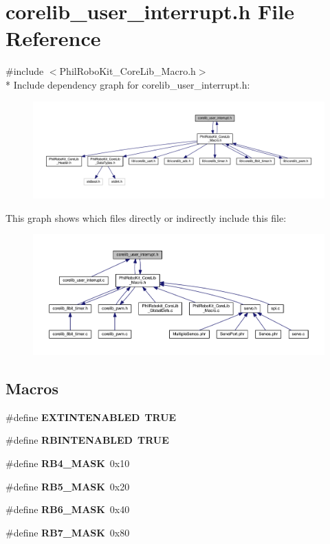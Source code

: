 \section{corelib\-\_\-user\-\_\-interrupt.\-h File Reference}
\label{corelib__user__interrupt_8h}
{\ttfamily \#include $<$Phil\-Robo\-Kit\-\_\-\-Core\-Lib\-\_\-\-Macro.\-h$>$}\\*
Include dependency graph for corelib\-\_\-user\-\_\-interrupt.\-h\-:\nopagebreak
\begin{figure}[H]
\begin{center}
\leavevmode
\includegraphics[width=350pt]{corelib__user__interrupt_8h__incl}
\end{center}
\end{figure}
This graph shows which files directly or indirectly include this file\-:\nopagebreak
\begin{figure}[H]
\begin{center}
\leavevmode
\includegraphics[width=350pt]{corelib__user__interrupt_8h__dep__incl}
\end{center}
\end{figure}
\subsection*{Macros}
\begin{DoxyCompactItemize}
\item 
\#define {\bf E\-X\-T\-I\-N\-T\-E\-N\-A\-B\-L\-E\-D}~{\bf T\-R\-U\-E}
\item 
\#define {\bf R\-B\-I\-N\-T\-E\-N\-A\-B\-L\-E\-D}~{\bf T\-R\-U\-E}
\item 
\#define {\bf R\-B4\-\_\-\-M\-A\-S\-K}~0x10
\item 
\#define {\bf R\-B5\-\_\-\-M\-A\-S\-K}~0x20
\item 
\#define {\bf R\-B6\-\_\-\-M\-A\-S\-K}~0x40
\item 
\#define {\bf R\-B7\-\_\-\-M\-A\-S\-K}~0x80
\end{DoxyCompactItemize}
